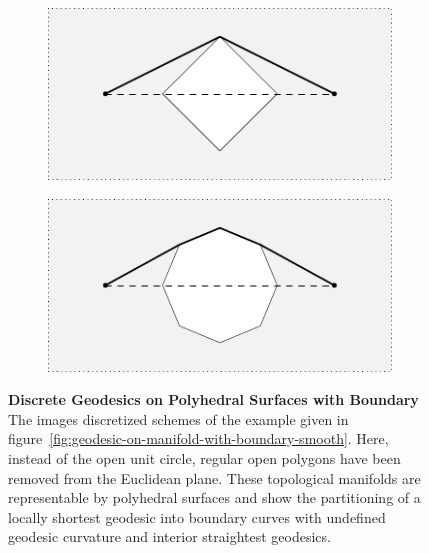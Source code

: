 \documentclass{stdlocal}
\begin{document}
  \begin{figure}
    \centering
    \begin{subfigure}[b]{0.49\linewidth}
      \centering
      \includegraphics[width=\linewidth]{figures/geodesic-on-boundary-discrete-1.pdf}
    \end{subfigure}
    \hfill
    \begin{subfigure}[b]{0.49\linewidth}
      \centering
      \includegraphics[width=\linewidth]{figures/geodesic-on-boundary-discrete-2.pdf}
    \end{subfigure}
    \caption[Discrete Geodesics on Polyhedral Surfaces with Boundary]{%
      \textbf{Discrete Geodesics on Polyhedral Surfaces with Boundary}\\
      The images discretized schemes of the example given in figure~\ref{fig:geodesic-on-manifold-with-boundary-smooth}.
      Here, instead of the open unit circle, regular open polygons have been removed from the Euclidean plane.
      These topological manifolds are representable by polyhedral surfaces and show the partitioning of a locally shortest geodesic into boundary curves with undefined geodesic curvature and interior straightest geodesics.
    }
    \label{fig:discrete-geodesics-on-boundary}
  \end{figure}
\end{document}
